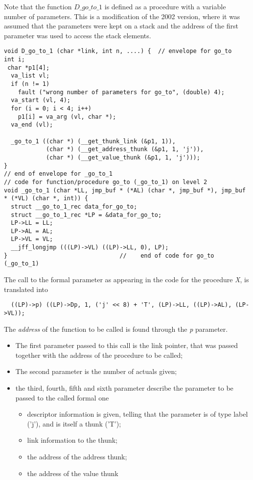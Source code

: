 \documentclass[11pt]{article}
\begin{document}
Note that the function $D\_go\_to\_1$ is defined as a procedure with a variable
number of parameters. This is a modification of the 2002 version, where it
was assumed that the parameters were kept on a stack and the address of the
first parameter was used to access the stack elements.
{\footnotesize
\begin{verbatim}
void D_go_to_1 (char *link, int n, ....) {  // envelope for go_to
int i;
 char *p1[4];
  va_list vl;
  if (n != 1)
    fault ("wrong number of parameters for go_to", (double) 4);
  va_start (vl, 4);
  for (i = 0; i < 4; i++)
    p1[i] = va_arg (vl, char *);
  va_end (vl);

  _go_to_1 ((char *) (__get_thunk_link (&p1, 1)),
            (char *) (__get_address_thunk (&p1, 1, 'j')),
            (char *) (__get_value_thunk (&p1, 1, 'j')));
}
// end of envelope for _go_to_1 
// code for function/procedure go_to (_go_to_1) on level 2
void _go_to_1 (char *LL, jmp_buf * (*AL) (char *, jmp_buf *), jmp_buf * (*VL) (char *, int)) {
  struct __go_to_1_rec data_for_go_to;
  struct __go_to_1_rec *LP = &data_for_go_to;
  LP->LL = LL;
  LP->AL = AL;
  LP->VL = VL;
  __jff_longjmp (((LP)->VL) ((LP)->LL, 0), LP);
}                                //    end of code for go_to (_go_to_1)
\end{verbatim}
}
The call to the formal parameter as appearing in the code
for the procedure {\em X}, is translated into
{\footnotesize
\begin{verbatim}
  ((LP)->p) ((LP)->Dp, 1, ('j' << 8) + 'T', (LP)->LL, ((LP)->AL), (LP->VL));
\end{verbatim}
}
The {\em address} of the function to be called is found through the {\em p}
parameter.
\begin{itemize}
\item The first parameter passed to this call is the link pointer, that
was passed together with the address of the procedure to be called;
\item The second parameter is the number of actuals given;
\item the third, fourth, fifth and sixth parameter describe the
parameter to be passed to the called formal one
\begin{itemize}
\item descriptor information is given, telling that the parameter is of type
label ('j'), and is itself a thunk ('T');
\item link information to the thunk;
\item the address of the address thunk;
\item the address of the value thunk
\end{itemize}
\end{itemize}
\end{document}
